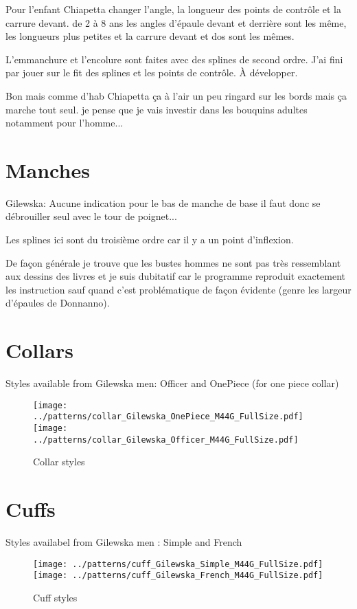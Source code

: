 \documentclass[11pt,a4paper]{report}
\begin{document}
Pour l'enfant Chiapetta changer l'angle, la longueur des points de contrôle et la carrure devant. de 2 à 8 ans les angles d'épaule devant et derrière sont les même, les longueurs plus petites et la carrure devant et dos sont les mêmes.

L'emmanchure et l'encolure sont faites avec des splines de second ordre. J'ai fini par jouer sur le fit des splines et les points de contrôle. À développer.

Bon mais comme d'hab Chiapetta ça à l'air un peu ringard sur les bords mais ça marche tout seul. je pense que je vais investir dans
les bouquins adultes notamment pour l'homme...


\section{Manches}
Gilewska: Aucune indication pour le bas de manche de base il faut donc
se débrouiller seul avec le tour de poignet...

Les splines ici sont du troisième ordre car il y a un point d'inflexion.


De façon générale je trouve que les bustes hommes ne sont pas très ressemblant aux dessins des livres et je suis dubitatif car le programme reproduit exactement les instruction sauf quand c'est problématique de façon évidente (genre les largeur d'épaules de Donnanno).


\section{Collars}
Styles available from Gilewska men: Officer and OnePiece (for one piece collar)

\begin{figure}
\begin{center}
\texttt{[image: ../patterns/collar\_Gilewska\_OnePiece\_M44G\_FullSize.pdf]}
\texttt{[image: ../patterns/collar\_Gilewska\_Officer\_M44G\_FullSize.pdf]}
\end{center}
\caption{Collar styles}
\end{figure}


\section{Cuffs}
Styles availabel from Gilewska men : Simple and French

\begin{figure}
\begin{center}
\texttt{[image: ../patterns/cuff\_Gilewska\_Simple\_M44G\_FullSize.pdf]}
\texttt{[image: ../patterns/cuff\_Gilewska\_French\_M44G\_FullSize.pdf]}
\end{center}
\caption{Cuff styles}
\end{figure}
\end{document}
